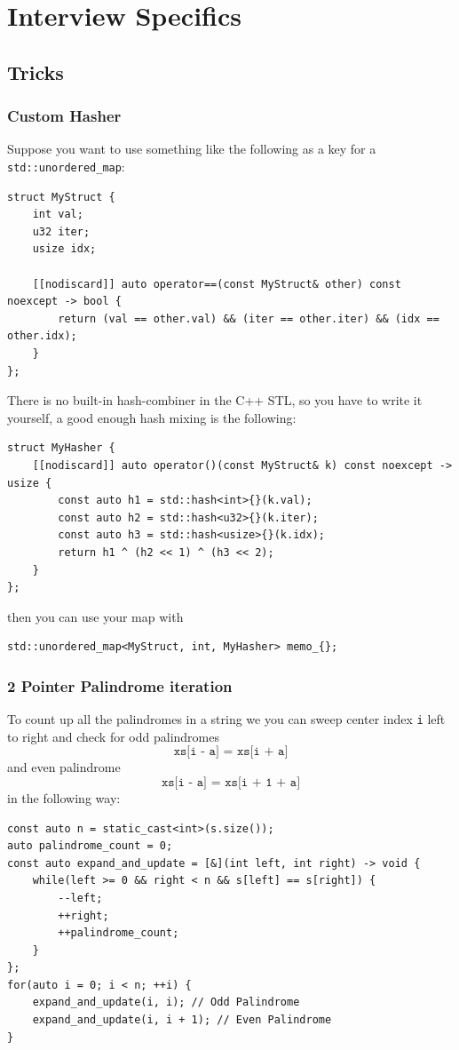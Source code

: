 \documentclass{article}
\begin{document}
\newpage{}
\section{Interview Specifics}
\subsection{Tricks}
\subsubsection{Custom Hasher}
Suppose you want to use something like the following as a key for a \texttt{std::unordered\_map}:
\begin{lstlisting}
struct MyStruct {
    int val;
    u32 iter;
    usize idx;

    [[nodiscard]] auto operator==(const MyStruct& other) const noexcept -> bool {
        return (val == other.val) && (iter == other.iter) && (idx == other.idx);
    }
};
\end{lstlisting}
There is no built-in hash-combiner in the C++ STL, so you have to write it yourself, a good enough hash mixing is the following:
\begin{lstlisting}
struct MyHasher {
    [[nodiscard]] auto operator()(const MyStruct& k) const noexcept -> usize {
        const auto h1 = std::hash<int>{}(k.val);
        const auto h2 = std::hash<u32>{}(k.iter);
        const auto h3 = std::hash<usize>{}(k.idx);
        return h1 ^ (h2 << 1) ^ (h3 << 2);
    }
};
\end{lstlisting}
then you can use your map with
\begin{lstlisting}
std::unordered_map<MyStruct, int, MyHasher> memo_{};
\end{lstlisting}

\subsubsection{2 Pointer Palindrome iteration}
To count up all the palindromes in a string we you can sweep center index \texttt{i} left to right and check for odd palindromes
\[
    \texttt{xs[i - a] = xs[i + a]}
\]
and even palindrome  
\[
    \texttt{xs[i - a] = xs[i + 1 + a]}
\]
in the following way:
\begin{lstlisting}
const auto n = static_cast<int>(s.size());
auto palindrome_count = 0;
const auto expand_and_update = [&](int left, int right) -> void {
    while(left >= 0 && right < n && s[left] == s[right]) {
        --left;
        ++right;
        ++palindrome_count;
    }
};
for(auto i = 0; i < n; ++i) {
    expand_and_update(i, i); // Odd Palindrome
    expand_and_update(i, i + 1); // Even Palindrome
}
\end{lstlisting}
\end{document}
